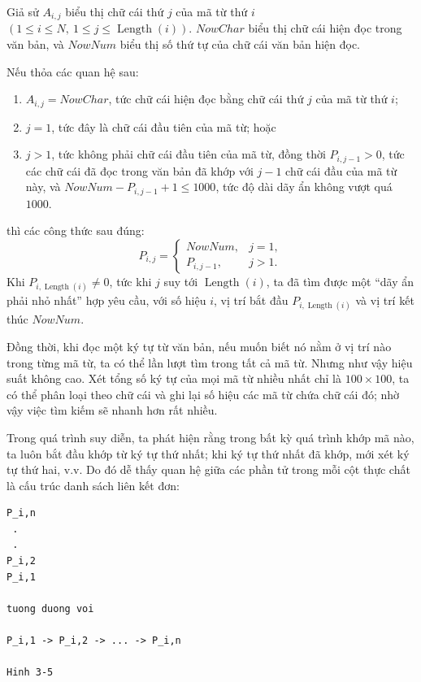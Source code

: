 \documentclass[11pt]{article}
\begin{document}
Giả sử \(A_{i,j}\) biểu thị chữ cái thứ \(j\) của mã từ thứ \(i\)
\((1\le i\le N,\ 1\le j\le \operatorname{Length}(i))\). \(\mathit{NowChar}\)
biểu thị chữ cái hiện đọc trong văn bản, và \(\mathit{NowNum}\) biểu thị số
thứ tự của chữ cái văn bản hiện đọc.

Nếu thỏa các quan hệ sau:
\begin{enumerate}
  \item \(A_{i,j}=\mathit{NowChar}\), tức chữ cái hiện đọc bằng chữ cái thứ
  \(j\) của mã từ thứ \(i\);
  \item \(j=1\), tức đây là chữ cái đầu tiên của mã từ; hoặc
  \item \(j>1\), tức không phải chữ cái đầu tiên của mã từ, đồng thời
  \(P_{i,j-1}>0\), tức các chữ cái đã đọc trong văn bản đã khớp với \(j-1\)
  chữ cái đầu của mã từ này, và
  \(\mathit{NowNum}-P_{i,j-1}+1\le 1000\), tức độ dài dãy ẩn không vượt quá
  \(1000\).
\end{enumerate}
thì các công thức sau đúng:
\[
P_{i,j}=
\begin{cases}
\mathit{NowNum}, & j=1,\\
P_{i,j-1}, & j>1.
\end{cases}
\]
Khi \(P_{i,\operatorname{Length}(i)}\ne 0\), tức khi \(j\) suy tới
\(\operatorname{Length}(i)\), ta đã tìm được một ``dãy ẩn phải nhỏ nhất'' hợp
yêu cầu, với số hiệu \(i\), vị trí bắt đầu \(P_{i,\operatorname{Length}(i)}\)
và vị trí kết thúc \(\mathit{NowNum}\).

Đồng thời, khi đọc một ký tự từ văn bản, nếu muốn biết nó nằm ở vị trí nào
trong từng mã từ, ta có thể lần lượt tìm trong tất cả mã từ. Nhưng như vậy
hiệu suất không cao. Xét tổng số ký tự của mọi mã từ nhiều nhất chỉ là
\(100\times 100\), ta có thể phân loại theo chữ cái và ghi lại số hiệu các mã
từ chứa chữ cái đó; nhờ vậy việc tìm kiếm sẽ nhanh hơn rất nhiều.

Trong quá trình suy diễn, ta phát hiện rằng trong bất kỳ quá trình khớp mã
nào, ta luôn bắt đầu khớp từ ký tự thứ nhất; khi ký tự thứ nhất đã khớp, mới
xét ký tự thứ hai, v.v. Do đó dễ thấy quan hệ giữa các phần tử trong mỗi cột
thực chất là cấu trúc danh sách liên kết đơn:

\begin{verbatim}
P_i,n
 .
 .
P_i,2
P_i,1

tuong duong voi

P_i,1 -> P_i,2 -> ... -> P_i,n

Hinh 3-5
\end{verbatim}
\end{document}
